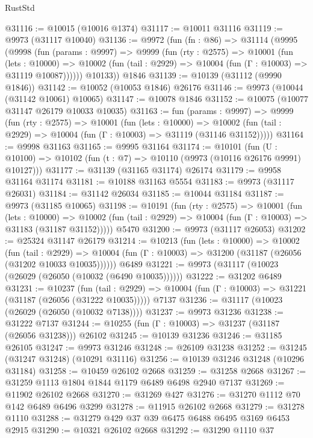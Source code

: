 \begin{lexlean}{RustStd}
\begin{coremodule}
@31116 := @10015 (@10016 @1374)
@31117 := @10011 @31116
@31119 := @9973 (@31117 @10040)
@31136 := @9972
    (fun (fn : @86) =>
    @31114
      (@9995
        (@9998
          (fun (params : @9997) =>
          @9999
            (fun (rty : @2575) =>
            @10001
              (fun (lets : @10000) =>
              @10002 (fun (tail : @2929) => @10004 (fun (Γ : @10003) => @31119 @10087))))))
        @10133))
    @1846
@31139 := @10139 (@31112 (@9990 @1846))
@31142 := @10052 (@10053 @1846) @26176
@31146 := @9973 (@10044 (@31142 @10061) @10065)
@31147 := @10078 @1846
@31152 := @10075 (@10077 @31147 @26179 @10033 @10035)
@31163 := fun (params : @9997) =>
  @9999
    (fun (rty : @2575) =>
    @10001
      (fun (lets : @10000) =>
      @10002 (fun (tail : @2929) => @10004 (fun (Γ : @10003) => @31119 (@31146 @31152)))))
@31164 := @9998 @31163
@31165 := @9995 @31164
@31174 := @10101
    (fun (U : @10100) => @10102 (fun (t : @7) => @10110 (@9973 (@10116 @26176 @9991) @10127)))
@31177 := @31139 (@31165 @31174) @26174
@31179 := @9958 @31164 @31174
@31181 := @10188 @31163 @5554
@31183 := @9973 (@31117 @26031)
@31184 := @31142 @26034
@31185 := @10044 @31184
@31187 := @9973 (@31185 @10065)
@31198 := @10191
    (fun (rty : @2575) =>
    @10001
      (fun (lets : @10000) =>
      @10002 (fun (tail : @2929) => @10004 (fun (Γ : @10003) => @31183 (@31187 @31152)))))
    @5470
@31200 := @9973 (@31117 @26053)
@31202 := @25324 @31147 @26179
@31214 := @10213
    (fun (lets : @10000) =>
    @10002
      (fun (tail : @2929) =>
      @10004 (fun (Γ : @10003) => @31200 (@31187 (@26056 (@31202 @10033 @10035))))))
    @6489
@31221 := @9973 (@31117 (@10023 (@26029 (@26050 (@10032 (@6490 @10035))))))
@31222 := @31202 @6489
@31231 := @10237
    (fun (tail : @2929) => @10004 (fun (Γ : @10003) => @31221 (@31187 (@26056 (@31222 @10035)))))
    @7137
@31236 := @31117 (@10023 (@26029 (@26050 (@10032 @7138))))
@31237 := @9973 @31236
@31238 := @31222 @7137
@31244 := @10255 (fun (Γ : @10003) => @31237 (@31187 (@26056 @31238))) @26102
@31245 := @10139 @31236
@31246 := @31185 @26105
@31247 := @9973 @31246
@31248 := @26109 @31238
@31252 := @31245 (@31247 @31248) (@10291 @31116)
@31256 := @10139 @31246 @31248 (@10296 @31184)
@31258 := @10459 @26102 @2668
@31259 := @31258 @2668
@31267 := @31259 @1113 @1804 @1844 @1179 @6489 @6498 @2940 @7137
@31269 := @11902 @26102 @2668
@31270 := @31269 @427
@31276 := @31270 @1112 @70 @142 @6489 @6496 @3299
@31278 := @11915 @26102 @2668
@31279 := @31278 @1110
@31288 := @31279 @429 @37 @39 @6475 @6488 @6495 @3169 @6453 @2915
@31290 := @10321 @26102 @2668
@31292 := @31290 @1110 @37

\end{coremodule}
\end{lexlean}
